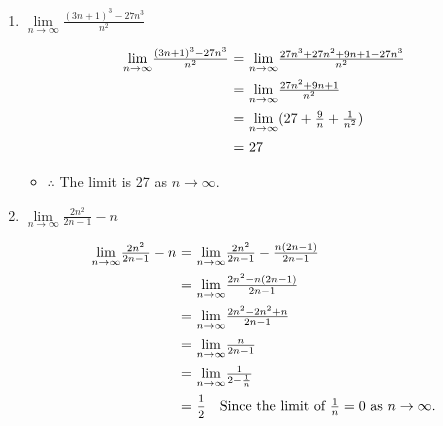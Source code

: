 \documentclass[12pt]{report}
\begin{document}
\begin{enumerate}[leftmargin=\labelsep]
\begin{enumerate}
            \item $\lim \limits_{n\rightarrow \infty} \frac{(3n+1)^3-27n^3}{n^2}$
                \begin{tcolorbox}
                    \begin{equation*}
                        \begin{array}{r@{~=~}l}
                            {\lim \limits_{{n\rightarrow \infty}}} \frac{(3n+1)^3-27n^3}{n^2} & {\lim \limits_{{n\rightarrow \infty}}} \frac{27n^3+27n^2+9n+1-27n^3}{n^2} \\ [2ex]
                            & {\lim \limits_{{n\rightarrow \infty}}} \frac{27n^2+9n+1}{n^2} \\ [2ex]
                            & {\lim \limits_{{n\rightarrow \infty}}} (27+\frac{9}{n}+\frac{1}{n^2}) \\ [2ex]
                            & 27
                        \end{array}
                    \end{equation*}
                    \begin{itemize}[label={}]
                        \item $\therefore$ The limit is 27 as $n \rightarrow \infty$.
                    \end{itemize}
                \end{tcolorbox}
\newpage
            \item $\lim \limits_{n\rightarrow \infty} \frac{2n^2}{2n-1}-n$
                \begin{tcolorbox}
                    \begin{equation*}
                        \begin{array}{r@{~=~}l}
                            {\lim \limits_{{n\rightarrow \infty}}} \frac{2n^2}{2n-1}-n & {\lim \limits_{{n\rightarrow \infty}}} \frac{2n^2}{2n-1}-\frac{n(2n-1)}{2n-1} \\ [2ex]
                            & {\lim \limits_{{n\rightarrow \infty}}} \frac{2n^2-n(2n-1)}{2n-1} \\ [2ex]
                            & {\lim \limits_{{n\rightarrow \infty}}} \frac{2n^2-2n^2+n}{2n-1} \\ [2ex]
                            & {\lim \limits_{{n\rightarrow \infty}}} \frac{n}{2n-1} \\ [2ex]
                            & {\lim \limits_{{n\rightarrow \infty}}} \frac{1}{2-\frac{1}{n}} \\ [2ex]
                            & \mfrac{1}{2} \quad \text{Since the limit of } \frac{1}{n} = 0 \text{ as } n \rightarrow \infty.

\end{array}
\end{equation*}
\end{tcolorbox}
\end{enumerate}
\end{enumerate}
\end{document}
